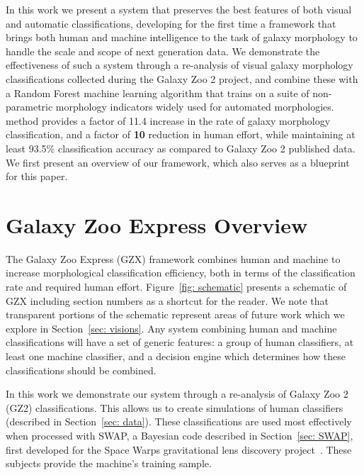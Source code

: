 \documentclass[twocolumn]{aastex6}%
\begin{document}
 In this work we present a system that preserves the best features of both visual 
and automatic classifications, developing for the first time a framework that 
brings both human and machine intelligence to the task of galaxy morphology to 
handle the scale and scope of next generation data. We demonstrate the 
effectiveness of such a system through a re-analysis of visual galaxy morphology
 classifications collected during the Galaxy Zoo 2 project, and combine these with a 
Random Forest machine learning algorithm that trains on a suite of non-parametric
 morphology indicators widely used for automated morphologies. 
  method 
provides a factor of 11.4 increase in the rate of galaxy morphology classification, 
and a factor of {\color{blue} \bf{10}} reduction in human effort, while maintaining at least 93.5\% 
classification accuracy as compared to Galaxy Zoo 2 published data. 
We first present an overview of our framework, which also serves as a blueprint for this paper. 


\section{Galaxy Zoo Express Overview}

The Galaxy Zoo Express (GZX) framework combines human and machine to
 increase morphological classification efficiency, both in terms of the classification rate 
and required human effort. Figure~\ref{fig: schematic} presents a schematic of 
GZX including section numbers as a shortcut for the reader. We note that transparent 
portions  of the schematic represent areas of future work which we explore in 
Section~\ref{sec: visions}. Any system combining human and machine classifications 
will have a set of generic features: a group of human classifiers, at least one 
machine classifier, and a decision engine which determines how these 
classifications should be combined.

In this work we demonstrate our system through a re-analysis of  Galaxy Zoo 2 (GZ2)
 classifications. This allows us to  create simulations of human classifiers (described in
 Section~\ref{sec: data}). These classifications are used most effectively when processed 
with SWAP, a Bayesian code described in Section~\ref{sec: SWAP}, first developed 
for the Space Warps gravitational lens discovery project~\citep{Marshall2016}. 
These subjects provide the machine's training sample. 
\end{document}
